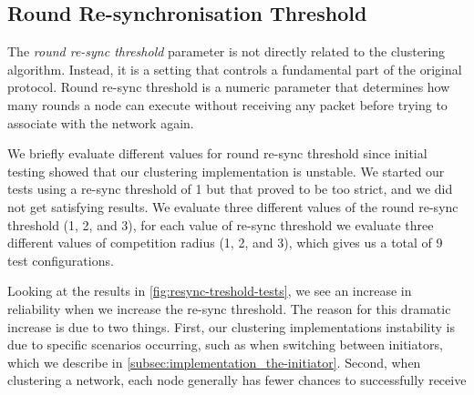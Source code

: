 \subsection{Round Re-synchronisation Threshold}
The \emph{round re-sync threshold} parameter is not directly related to the clustering algorithm. Instead, it is a setting that controls a fundamental part of the original \atwo{} protocol. Round re-sync threshold is a numeric parameter that determines how many rounds a node can execute without receiving any packet before trying to associate with the network again. 

We briefly evaluate different values for round re-sync threshold since initial testing showed that our clustering implementation is unstable. We started our tests using a re-sync threshold of 1 but that proved to be too strict, and we did not get satisfying results. We evaluate three different values of the round re-sync threshold (1, 2, and 3), for each value of re-sync threshold we evaluate three different values of competition radius (1, 2, and 3), which gives us a total of 9 test configurations.

Looking at the results in \cref{fig:resync-treshold-tests}, we see an increase in reliability when we increase the re-sync threshold. The reason for this dramatic increase is due to two things. First, our clustering implementations instability is due to specific scenarios occurring, such as when switching between initiators, which we describe in \cref{subsec:implementation_the-initiator}. Second, when clustering a network, each node generally has fewer chances to successfully receive

